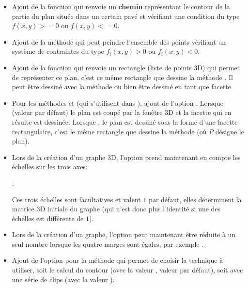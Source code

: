 \begin{itemize}
    \item Ajout de la fonction  qui renvoie un \textbf{chemin} représentant le contour de la partie du plan située dans un certain pavé et vérifiant une condition du type $f(x,y)>=0$ ou $f(x,y)<=0$.
    
    \item Ajout de la méthode  qui peut peindre l'ensemble des points vérifiant un système de contraintes du type $f_i(x,y)>0$ ou $f_i(x,y)<0$.
    
    \item Ajout de la fonction  qui renvoie un rectangle (liste de points 3D) qui permet de représenter ce plan, c'est ce même rectangle que dessine la méthode . Il peut être dessiné avec la méthode  ou bien être dessiné en tant que facette.
    
    \item Pour les méthodes  et  (qui s'utilisent dans ), ajout de l'option . Lorsque  (valeur par défaut) le plan est coupé par la fenêtre 3D et la facette qui en résulte est dessinée. Lorsque , le plan est dessiné sous la forme d'une facette rectangulaire, c'est le même rectangle que dessine la méthode  (où $P$ désigne le plan).
    
    \item Lors de la création d'un graphe 3D, l'option  prend maintenant en compte les échelles sur les trois axes: \par
    \hfil{}.\hfil\par
    Ces trois échelles sont facultatives et valent $1$ par défaut, elles déterminent la matrice 3D initiale du graphe (qui n'est donc plus l'identité si une des échelles est différente de $1$).
    
    \item Lors de la création d'un graphe, l'option  peut maintenant être réduite à un seul nombre lorsque les quatre marges sont égales, par exemple .
    
    \item Ajout de l'option  pour la méthode  qui permet de choisir la technique à utiliser, soit le calcul du contour (avec la valeur \false, valeur par défaut), soit avec une série de clips (avec la valeur \true).
    

\end{itemize}
